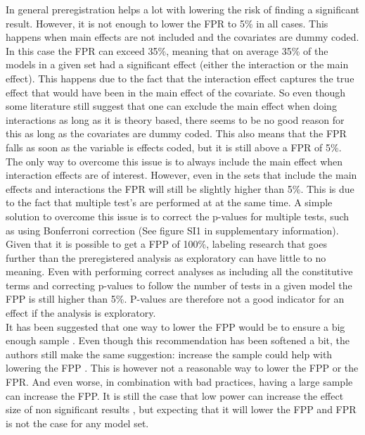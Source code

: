 In general preregistration helps a lot with lowering the risk of finding a significant result. However, it is not enough to lower the FPR to 5\%  in all cases. This happens when main effects are not included and the covariates are dummy coded. In this case the FPR can exceed 35\%, meaning that on average 35\% of the models in a given set had a significant effect (either the interaction or the main effect). This happens due to the fact that the interaction effect captures the true effect that would have been in the main effect of the covariate. So even though some literature still suggest that one can exclude the main effect when doing interactions as long as it is theory based, there seems to be no good reason for this as long as the covariates are dummy coded. This also means that the FPR falls as soon as the variable is effects coded, but it is still above a FPR of 5\%. The only way to overcome this issue is to always include the main effect when interaction effects are of interest. However, even in the sets that include the main effects and interactions the FPR will still be slightly higher than 5\%. This is due to the fact that multiple test's are performed at at the same time. A simple solution to overcome this issue is to correct the p-values for multiple tests, such as using Bonferroni correction \citep{dunn1961multiple} (See figure SI1 in supplementary information).  \\
Given that it is possible to get a FPP of 100\%, labeling research that goes further than the preregistered analysis as exploratory can have little to no meaning. Even with performing correct analyses as including all the constitutive terms and correcting p-values to follow the number of tests in a given model the FPP is still higher than 5\%. P-values are therefore not a good indicator for an effect if the analysis is exploratory. \\
    
It has been suggested that one way to lower the FPP would be to ensure a big enough sample \citep{Simmons2011}. Even though this recommendation has been softened a bit, the authors still make the same suggestion: increase the sample could help with lowering the FPP \cite{simmons2018}. This is however not a reasonable way to lower the FPP or the FPR. And even worse, in combination with bad practices, having a large sample can increase the FPP. It is still the case that low power can increase the effect size of non significant results \citep{loken2017measurement}, but expecting that it will lower the FPP and FPR is not the case for any model set. 

